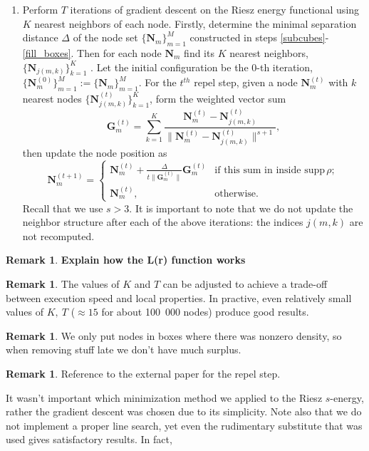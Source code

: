 \documentclass{amsart}
\newcommand{\bs}[1]{\boldsymbol{#1}}
\theoremstyle{definition}
\newtheorem{remark}[theorem]{Remark}
\begin{document}
\begin{enumerate}
	\item Perform $ T $ iterations of gradient descent on the Riesz energy functional using $ K $ nearest neighbors of each node. 
	Firstly, determine the minimal separation distance $ \Delta $ of the node set $ \{\boldsymbol{N}_m\}_{m=1}^M $ constructed in steps \eqref{subcubes}-\eqref{fill_boxes}. Then for each node $ \boldsymbol{N}_m $ find its $ K $ nearest neighbors, $ \{\boldsymbol{N}_{j(m,k)}\}_{k=1}^K $ . Let the initial configuration be the $ 0 $-th iteration, $ \{\boldsymbol{N}_m^{(0)}\}_{m=1}^M := \{\boldsymbol{N}_m\}_{m=1}^M $. For the $t^{th}$ repel step, given a node $\boldsymbol{N}_m^{(t)}$ with $ k $ nearest nodes $\{ \boldsymbol{N}_{j(m,k)}^{(t)}\}_{k=1}^K$, form the weighted vector sum
	\[ \bs{G}_m^{(t)} =\sum_{k=1}^{K}\frac{\boldsymbol{N}_m^{(t)}-\boldsymbol{N}_{j(m,k)}^{(t)} }{\|\boldsymbol{N}_m^{(t)}-\boldsymbol{N}_{j(m,k)}^{(t)} \|^{s+1}}, \]
	then update the node position as
	\[\boldsymbol{N}_m^{(t+1)} = \begin{cases}
	\bs{N}_m^{(t)} + \frac{\Delta}{t\|\bs{G}_m^{(t)}\|}\bs{G}_m^{(t)} &\text{if this sum in inside }\text{supp}\,\rho; \\
	\bs{N}_m^{(t)}, &\text{otherwise.}
	\end{cases} \]
	Recall that we use $s>3$.
	It is important to note that we do not update the neighbor structure after each of the above iterations: the indices $ j(m,k) $ are not recomputed.
\end{enumerate}

\begin{remark}\label{Lfun}
	\textbf{Explain how the L(r) function works}
\end{remark}
\begin{remark}\label{KandT}
	The values of $ K $ and $ T $ can be adjusted to achieve a trade-off between execution speed and local properties. In practive, even relatively small values of $ K,\ T $ ($ \approx 15 $ for about 100~000 nodes) produce good results. \\
\end{remark}
\begin{remark}
	We only put nodes in boxes where there was nonzero density, so when removing stuff late we don't have much surplus.
\end{remark}
\begin{remark}
	Reference to the external paper for the repel step.
\end{remark}
It wasn't important which minimization method we applied to the Riesz $ s $-energy, rather the gradient descent was chosen due to its simplicity. Note also that we do not implement a proper line search, yet even the rudimentary substitute that was used gives satisfactory results. In fact, 
\end{document}

